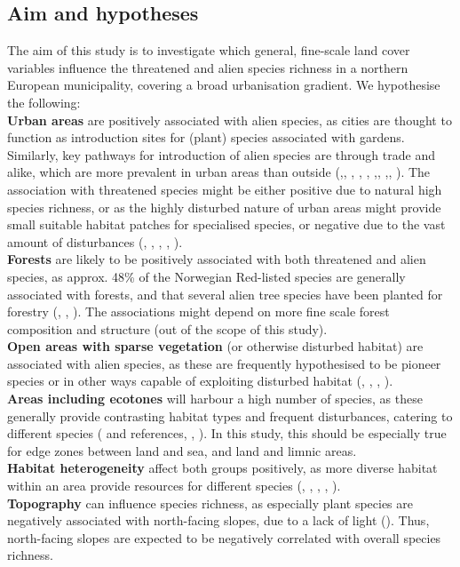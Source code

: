 \documentclass{article}
\begin{document}
\subsection{Aim and hypotheses}    
The aim of this study is to investigate which general, fine-scale land cover variables influence the threatened and alien species richness in a northern European  municipality, covering a broad urbanisation gradient. We hypothesise the following:\\
\textbf{Urban areas} are positively associated with alien species, as cities are thought to function as introduction sites for (plant) species associated with gardens. Similarly, key pathways for introduction of alien species are through trade and alike, which are more prevalent in urban areas than outside (\cite{Pysek1998},\cite{McKinney2002}, \cite{Deutschewitz2003}, \cite{Kuhn2006}, \cite{McKinney2006}, \cite{Kowarik2011},\cite{Polce2011}, \cite{Genovesi2013},\cite{Cadotte2017}, \cite{Padayachee2017}). 
The association with threatened species might be either positive due to natural high species richness, or as the highly disturbed nature of urban areas might provide small suitable habitat patches for specialised species, or negative due to the vast amount of disturbances (\cite{McKinney2002}, \cite{Kuhn2004}, \cite{Kowarik2011}, \cite{Aronson2014}, \cite{Ives2016}).\\
\textbf{Forests} are likely to be positively associated with both threatened and alien species, as approx. 48\% of the Norwegian Red-listed species are generally associated with forests, and that several alien tree species have been planted for forestry (\cite{Presto2005}, \cite{Presto2013}, \cite{Henriksen2015}). The associations might depend on more fine scale forest composition and structure (out of the scope of this study).\\
\textbf{Open areas with sparse vegetation} (or otherwise disturbed habitat) are associated with alien species, as these are frequently hypothesised to be pioneer species or in other ways capable of exploiting disturbed habitat (\cite{Maskell2006}, \cite{Kowarik2011}, \cite{Polce2011}, \cite{Cadotte2017}).\\
\textbf{Areas including ecotones} will harbour a high number of species, as these generally provide contrasting habitat types and frequent disturbances, catering to different species (\cite{Lloyd2000} and references, \cite{Walker2003}, \cite{Maskell2006}). In this study, this should be especially true for edge zones between land and sea, and land and limnic areas.  \\
\textbf{Habitat heterogeneity} affect both groups positively, as more diverse habitat within an area provide resources for different species (\cite{Araujo2003}, \cite{Deutschewitz2003}, \cite{Sattler2010}, \cite{Aronson2017}, \cite{Matthies2017}).\\
\textbf{Topography} can influence species richness, as especially plant species are negatively associated with north-facing slopes, due to a lack of light (\cite{Holland1975}). Thus, north-facing slopes are expected to be negatively correlated with overall species richness.
\end{document}
